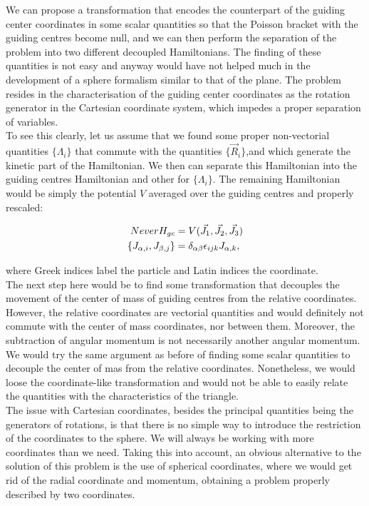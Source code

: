 We can propose a transformation that encodes the counterpart of the guiding center coordinates in some scalar quantities so that the Poisson bracket with the guiding centres become null, and we can then perform the separation of the problem into two different decoupled Hamiltonians. The finding of these quantities is not easy and anyway would have not helped much in the development of a sphere formalism similar to that of the plane. The problem resides in the characterisation of the guiding center coordinates as the rotation generator in the Cartesian coordinate system, which impedes a proper separation of variables.\\

To see this clearly, let us assume that we found some proper non-vectorial quantities $\{\Lambda_i\}$ that commute with the quantities $\{\vec{R}_i\}$,and which generate the kinetic part of the Hamiltonian. We then can separate this Hamiltonian into the guiding centres Hamiltonian and other for $\{\Lambda_i\}$. The remaining Hamiltonian would be simply the potential $V$ averaged over the guiding centres and properly rescaled:

\begin{align*}Never
H_{gc} &= V(\vec{J_1},\vec{J_2},\vec{J_3})\\
\left\lbrace J_{\alpha,i}, J_{\beta,j} \right\rbrace &= \delta_{\alpha\beta}\epsilon_{ijk} J_{\alpha,k},
\end{align*}

where Greek indices label the particle and Latin indices the coordinate. \\

The next step here would be to find some transformation that decouples the movement of the center of mass of guiding centres from the relative coordinates. However, the relative coordinates are vectorial quantities and would definitely not commute with the center of mass coordinates, nor between them. Moreover, the subtraction of angular momentum is not necessarily another angular momentum. \\

We would try the same argument as before of finding some scalar quantities to decouple the center of mas from the relative coordinates. Nonetheless, we would loose the coordinate-like transformation and would not be able to easily relate the quantities with the characteristics of the triangle.\\

The issue with Cartesian coordinates, besides the principal quantities being the generators of rotations, is that there is no simple way to introduce the restriction of the coordinates to the sphere. We will always be working with more coordinates than we need. Taking this into account, an obvious alternative to the solution of this problem is the use of spherical coordinates, where we would get rid of the radial coordinate and momentum, obtaining a problem properly described by two coordinates.\\ 

